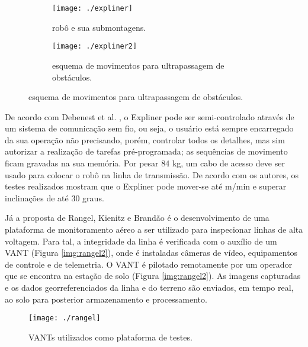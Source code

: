 \begin{figure}[h!]
		\caption{Robô Expliner.}
		\begin{subfigure}[b]{0.5\textwidth}
		  	\centering
		  	\texttt{[image: ./expliner]} 
		  	\caption{robô e sua submontagens.}
		  	\label{img:expliner1}
		\end{subfigure}
		\begin{subfigure}[b]{0.5\textwidth}
		  	\centering
		  	\texttt{[image: ./expliner2]} 
		  	\caption{esquema de movimentos para ultrapassagem de obstáculos.}
		  	\label{img:expliner2}
		\end{subfigure} 
	  \label{img:expliner}
\end{figure}

De acordo com Debenest et al. \cite{debenest2008expliner}, o Expliner pode ser semi-controlado através de um sistema de comunicação sem fio, ou seja, o usuário está sempre encarregado da sua operação não precisando, porém, controlar todos os detalhes, mas sim autorizar a realização de tarefas pré-programada; as sequências de movimento ficam gravadas na sua memória. Por pesar 84 kg, um cabo de acesso deve ser usado para colocar o robô na linha de transmissão.  De acordo com os autores, os testes realizados mostram que o Expliner pode mover-se até m/min e superar inclinações de até 30 graus. 

Já a proposta de Rangel, Kienitz e Brandão \cite{rangel2009sistema} é o desenvolvimento de uma plataforma de monitoramento aéreo a ser utilizado para inspecionar linhas de alta voltagem. Para tal, a integridade da linha é verificada com o auxílio de um VANT (Figura \ref{img:rangel2}), onde é instaladas câmeras de vídeo, equipamentos de controle e de telemetria. O VANT é pilotado remotamente por um operador que se encontra na estação de solo (Figura \ref{img:rangel2}). As imagens capturadas e os dados georreferenciados da linha e do terreno são enviados, em tempo real, ao solo para posterior armazenamento e processamento.

\begin{figure} [h!]	
	\caption{VANTs utilizados como plataforma de testes.}
	\label{img:rangel1}											 
	\centering													 
	\texttt{[image: ./rangel]}
\end{figure}													 

